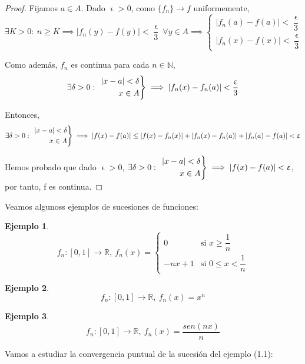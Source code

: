 \documentclass[11pt, a4paper]{article}
\let\epsilon\upvarepsilon
\providecommand{\abs}[1]{\lvert#1\rvert}
\newcommand{\R}{\mathbb{R}}
\newcommand{\N}{\mathbb{N}}
\newcommand{\fn}{\{f_n\}}
\theoremstyle{theorem-style}
\theoremstyle{definition-style}
\theoremstyle{remark-style}
\theoremstyle{example-style}
\newtheorem{ejemplo}{Ejemplo}[section]
\newenvironment{rcases}
  {\left.\begin{aligned}}
  {\end{aligned}\right\rbrace}
\begin{document}
\begin{proof}
	Fijamos $a\in A$. Dado $\epsilon>0$, como $\fn\to f$ uniformemente,
	\[
	\exists K>0:\ n\ge K \implies \abs{f_n(y)-f(y)}<\dfrac{\epsilon}{3}\ \forall y\in A \implies \begin{cases}
	\abs{f_n(a)-f(a)}<\dfrac{\epsilon}{3}\\
	\abs{f_n(x)-f(x)}<\dfrac{\epsilon}{3}
\end{cases}
	\]
	
	Como además, $f_n$ es continua para cada $n\in \N$,
	\[
	\exists \delta>0:\ \begin{rcases}
	\abs{x-a}<\delta\\
	x\in A
\end{rcases} \implies \abs{f_n(x)-f_n(a)} < \dfrac{\epsilon}{3}
	\] 
	
	Entonces,
	\[
	\exists \delta>0:\ \begin{rcases}
	\abs{x-a}<\delta\\
	x\in A
\end{rcases} \implies \abs{f(x)-f(a)} \le \abs{f(x)-f_n(x)} + \abs{f_n(x)-f_n(a)}+\abs{f_n(a)-f(a)} < \epsilon
	\]
	
	Hemos probado que dado $\epsilon > 0$, $\exists \delta>0:\ \begin{rcases}
	\abs{x-a}<\delta\\
	x\in A
	\end{rcases} \implies \abs{f(x)-f(a)}<\epsilon$, por tanto, f es continua. 
\end{proof}

Veamos algunoss ejemplos de sucesiones de funciones:

\begin{ejemplo}
	\[
		f_n : [0,1] \to \R,\ f_n(x) = \begin{cases}
	         0 & \text{si } x\ge \dfrac{1}{n}\\
	         -nx+1 & \text{si } 0\le x < \dfrac{1}{n}
\end{cases}
	\]
\end{ejemplo}

\begin{ejemplo}
	\[
	f_n : [0,1] \to \R,\ f_n(x) = x^n
	\]
\end{ejemplo}

\begin{ejemplo}
	\[
	f_n : [0,1] \to \R,\ f_n(x) = \dfrac{sen(nx)}{n}
	\]
\end{ejemplo}


Vamos a estudiar la convergencia puntual de la sucesión del ejemplo (1.1):
\end{document}
